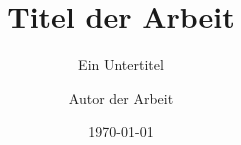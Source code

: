 \title{Titel der Arbeit}
\subtitle{Ein Untertitel}
\author{Autor der Arbeit}
\date{\today}
\maketitle
\thispagestyle{empty}
\clearpage
\tableofcontents

